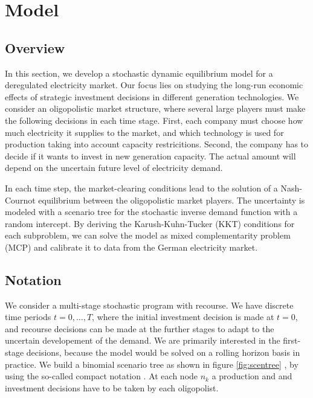 \section{Model}
\label{sec:model}

\subsection{Overview}

In this section, we develop a stochastic dynamic equilibrium model for a deregulated electricity market. Our focus lies on studying the long-run economic effects of strategic investment decisions in different generation technologies. We consider an oligopolistic market structure, where several large players must make the following decisions in each time stage. First, each company must choose how much electricity it supplies to the market, and which technology is used for production taking into account capacity restricitions. Second, the company has to decide if it wants to invest in new generation capacity. The actual amount will depend on the uncertain future level of electricity demand.

In each time step, the market-clearing conditions lead to the solution of a Nash-Cournot equilibrium between the oligopolistic market players. The uncertainty is modeled with a scenario tree for the stochastic inverse demand function with a random intercept. By deriving the Karush-Kuhn-Tucker (KKT) conditions for each subproblem, we can solve the model as mixed complementarity problem (MCP) and calibrate it to data from the German electricity market.

\subsection{Notation}

We consider a multi-stage stochastic program with recourse. We have discrete time periods $t=0,\dots,T$, where the initial investment decision is made at $t=0$, and recourse decisions can be made at the further stages to adapt to the uncertain developement of the demand. We are primarily interested in the first-stage decisions, because the model would be solved on a rolling horizon basis in practice. We build a binomial scenario tree as shown in figure \ref{fig:scentree} , by using the so-called compact notation \cite[see e.g.][]{Brandimarte2006}.  At each node $n_k$ a production and and investment decisions have to be taken by each oligopolist.

